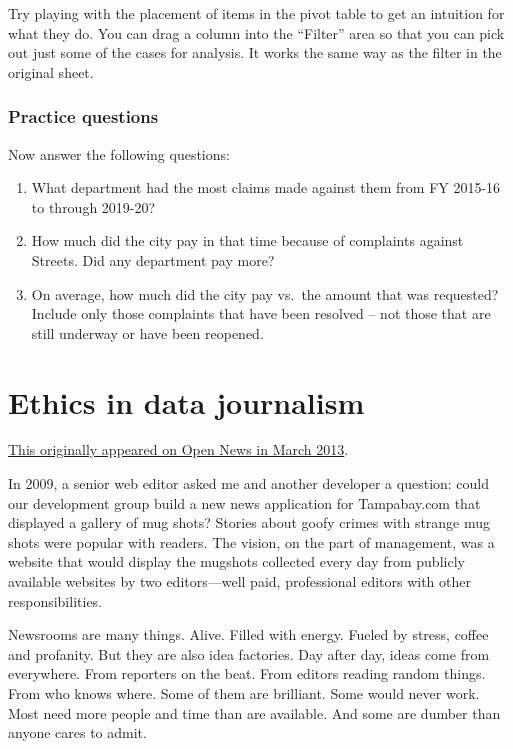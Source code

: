 \documentclass[
  letterpaper,
  DIV=11,
  numbers=noendperiod]{scrreprt}
\begin{document}
Try playing with the placement of items in the pivot table to get an
intuition for what they do. You can drag a column into the ``Filter''
area so that you can pick out just some of the cases for analysis. It
works the same way as the filter in the original sheet.

\hypertarget{practice-questions}{%
\subsection{Practice questions}\label{practice-questions}}

Now answer the following questions:

\begin{enumerate}
\def\labelenumi{\arabic{enumi}.}
\item
  What department had the most claims made against them from FY 2015-16
  to through 2019-20?
\item
  How much did the city pay in that time because of complaints against
  Streets. Did any department pay more?
\item
  On average, how much did the city pay vs.~the amount that was
  requested? Include only those complaints that have been resolved --
  not those that are still underway or have been reopened.
\end{enumerate}


\hypertarget{ethics-in-data-journalism}{%
\chapter{Ethics in data journalism}\label{ethics-in-data-journalism}}

\href{https://source.opennews.org/articles/public-info-doesnt-always-want-be-free/}{This
originally appeared on Open News in March 2013}.

In 2009, a senior web editor asked me and another developer a question:
could our development group build a new news application for
Tampabay.com that displayed a gallery of mug shots? Stories about goofy
crimes with strange mug shots were popular with readers. The vision, on
the part of management, was a website that would display the mugshots
collected every day from publicly available websites by two
editors---well paid, professional editors with other responsibilities.

Newsrooms are many things. Alive. Filled with energy. Fueled by stress,
coffee and profanity. But they are also idea factories. Day after day,
ideas come from everywhere. From reporters on the beat. From editors
reading random things. From who knows where. Some of them are brilliant.
Some would never work. Most need more people and time than are
available. And some are dumber than anyone cares to admit.
\end{document}
